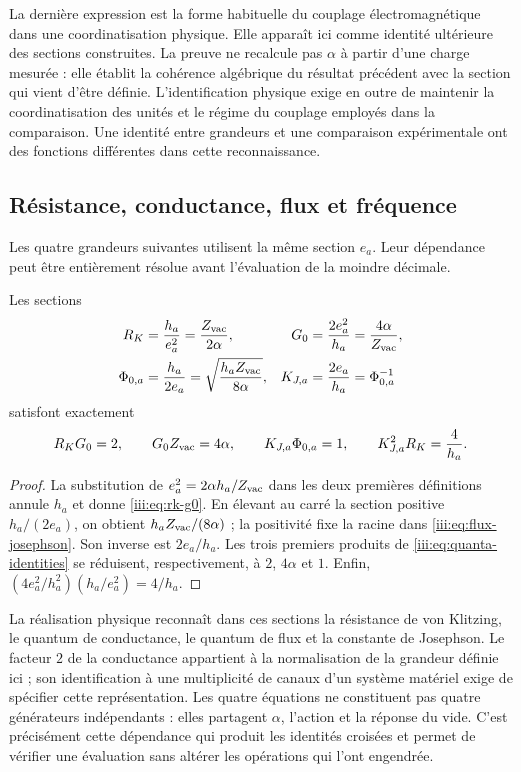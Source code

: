 La dernière expression est la forme habituelle du couplage électromagnétique
dans une coordinatisation physique. Elle apparaît ici comme identité ultérieure des sections
construites. La preuve ne recalcule pas $\alpha$ à partir d’une charge
mesurée : elle établit la cohérence algébrique du résultat précédent avec la
section qui vient d’être définie. L’identification physique exige en outre
de maintenir la coordinatisation des unités et le régime du couplage employés dans la
comparaison. Une identité entre grandeurs et une comparaison expérimentale
ont des fonctions différentes dans cette reconnaissance.

\subsection{Résistance, conductance, flux et fréquence}

Les quatre grandeurs suivantes utilisent la même section $e_a$. Leur
dépendance peut être entièrement résolue avant l’évaluation de la moindre décimale.

\begin{theorem}
Les sections
\begin{align}
 R_K&=\frac{h_a}{e_a^2}=\frac{Z_{\rm vac}}{2\alpha},
 &G_0&=\frac{2e_a^2}{h_a}=\frac{4\alpha}{Z_{\rm vac}},
 \label{iii:eq:rk-g0}\\
 \Phi_{0,a}&=\frac{h_a}{2e_a}
 =\sqrt{\frac{h_aZ_{\rm vac}}{8\alpha}},
 &K_{J,a}&=\frac{2e_a}{h_a}=\Phi_{0,a}^{-1}
 \label{iii:eq:flux-josephson}
\end{align}
satisfont exactement
\begin{equation}
 R_KG_0=2,\qquad G_0Z_{\rm vac}=4\alpha,\qquad
 K_{J,a}\Phi_{0,a}=1,\qquad
 K_{J,a}^{2}R_K=\frac4{h_a}.
 \label{iii:eq:quanta-identities}
\end{equation}
\end{theorem}
\begin{proof}
La substitution de $e_a^2=2\alpha h_a/Z_{\rm vac}$ dans les deux premières
définitions annule $h_a$ et donne \eqref{iii:eq:rk-g0}. En élevant au
carré la section positive $h_a/(2e_a)$, on obtient
$h_aZ_{\rm vac}/(8\alpha)$ ; la positivité fixe la racine dans
\eqref{iii:eq:flux-josephson}. Son inverse est $2e_a/h_a$.
Les trois premiers produits de \eqref{iii:eq:quanta-identities} se
réduisent, respectivement, à $2$, $4\alpha$ et $1$. Enfin,
$(4e_a^2/h_a^2)(h_a/e_a^2)=4/h_a$.
\end{proof}

La réalisation physique reconnaît dans ces sections la résistance de von Klitzing, le quantum de conductance, le quantum de flux et la constante de Josephson. Le facteur $2$ de la conductance appartient à la normalisation de la grandeur définie ici ; son identification à une multiplicité de canaux d'un système matériel exige de spécifier cette représentation.
Les quatre équations ne constituent pas quatre générateurs indépendants : elles partagent $\alpha$, l'action et la réponse du vide. C'est précisément cette dépendance qui produit les identités croisées et permet de vérifier une évaluation sans altérer les opérations qui l'ont engendrée.

